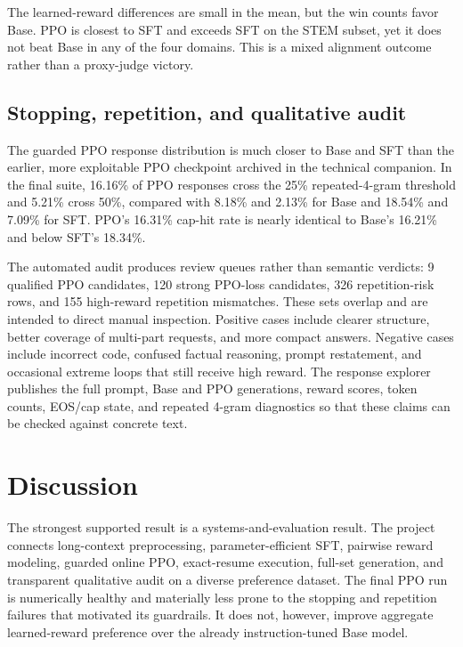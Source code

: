 \documentclass[10pt,twocolumn]{article}
\begin{document}
The learned-reward differences are small in the mean, but the win counts favor
Base. PPO is closest to SFT and exceeds SFT on the STEM subset, yet it does not
beat Base in any of the four domains. This is a mixed alignment outcome rather
than a proxy-judge victory.

\subsection{Stopping, repetition, and qualitative audit}

The guarded PPO response distribution is much closer to Base and SFT than the
earlier, more exploitable PPO checkpoint archived in the technical companion.
In the final suite, 16.16\% of PPO responses cross the 25\% repeated-4-gram
threshold and 5.21\% cross 50\%, compared with 8.18\% and 2.13\% for Base and
18.54\% and 7.09\% for SFT. PPO's 16.31\% cap-hit rate is nearly identical to
Base's 16.21\% and below SFT's 18.34\%.

The automated audit produces review queues rather than semantic verdicts: 9
qualified PPO candidates, 120 strong PPO-loss candidates, 326 repetition-risk
rows, and 155 high-reward repetition mismatches. These sets overlap and are
intended to direct manual inspection. Positive cases include clearer structure,
better coverage of multi-part requests, and more compact answers. Negative
cases include incorrect code, confused factual reasoning, prompt restatement,
and occasional extreme loops that still receive high reward. The response
explorer publishes the full prompt, Base and PPO generations, reward scores,
token counts, EOS/cap state, and repeated 4-gram diagnostics so that these
claims can be checked against concrete text.

\section{Discussion}

The strongest supported result is a systems-and-evaluation result. The project
connects long-context preprocessing, parameter-efficient SFT, pairwise reward
modeling, guarded online PPO, exact-resume execution, full-set generation, and
transparent qualitative audit on a diverse preference dataset. The final PPO
run is numerically healthy and materially less prone to the stopping and
repetition failures that motivated its guardrails. It does not, however,
improve aggregate learned-reward preference over the already instruction-tuned
Base model.
\end{document}
